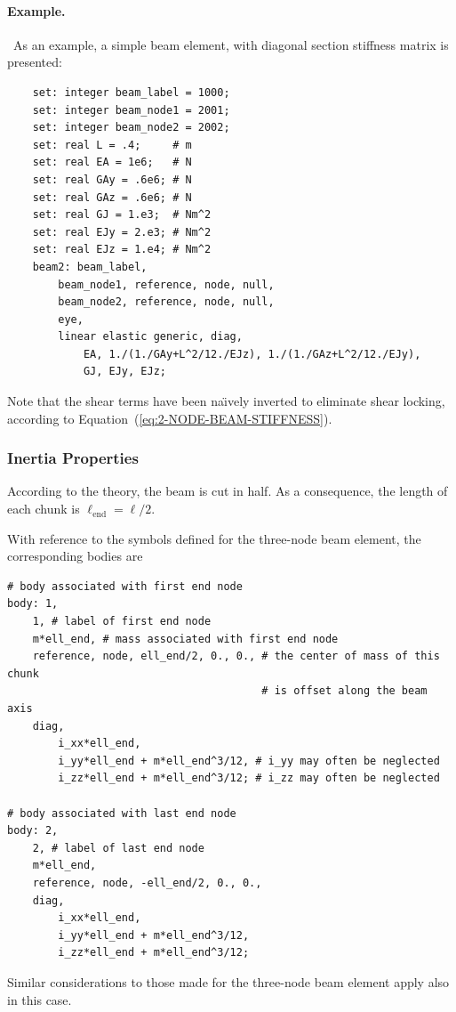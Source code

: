 \paragraph{Example.} \
As an example, a simple beam element, with diagonal section stiffness 
matrix is presented:
\begin{verbatim}
    set: integer beam_label = 1000;
    set: integer beam_node1 = 2001;
    set: integer beam_node2 = 2002;
    set: real L = .4;     # m
    set: real EA = 1e6;   # N
    set: real GAy = .6e6; # N
    set: real GAz = .6e6; # N
    set: real GJ = 1.e3;  # Nm^2
    set: real EJy = 2.e3; # Nm^2
    set: real EJz = 1.e4; # Nm^2
    beam2: beam_label,
        beam_node1, reference, node, null,
        beam_node2, reference, node, null,
        eye,
        linear elastic generic, diag,
            EA, 1./(1./GAy+L^2/12./EJz), 1./(1./GAz+L^2/12./EJy),
            GJ, EJy, EJz;
\end{verbatim}
Note that the shear terms have been na\"{\i}vely inverted to eliminate
shear locking, according to Equation~(\ref{eq:2-NODE-BEAM-STIFFNESS}).


\subsubsection{Inertia Properties}
According to the theory, the beam is cut in half.
As a consequence, the length of each chunk is $\ell_{\text{end}} = \ell/2$.

With reference to the symbols defined for the three-node beam element, the corresponding bodies are
\begin{verbatim}
# body associated with first end node
body: 1,
    1, # label of first end node
    m*ell_end, # mass associated with first end node
    reference, node, ell_end/2, 0., 0., # the center of mass of this chunk
                                        # is offset along the beam axis
    diag,
        i_xx*ell_end,
        i_yy*ell_end + m*ell_end^3/12, # i_yy may often be neglected
        i_zz*ell_end + m*ell_end^3/12; # i_zz may often be neglected

# body associated with last end node
body: 2,
    2, # label of last end node
    m*ell_end,
    reference, node, -ell_end/2, 0., 0.,
    diag,
        i_xx*ell_end,
        i_yy*ell_end + m*ell_end^3/12,
        i_zz*ell_end + m*ell_end^3/12;
\end{verbatim}
Similar considerations to those made for the three-node beam element apply also in this case.



